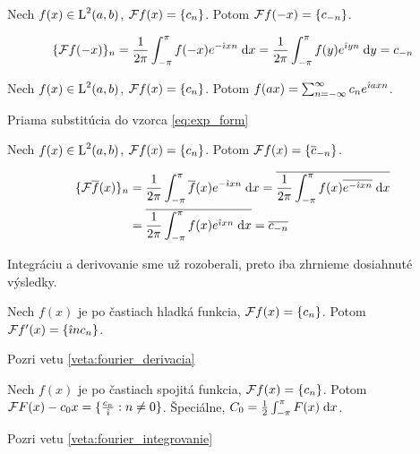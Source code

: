 \begin{veta}
Nech $f(x) \in \mbox{L}^2(a,b)$, $\mathcal{F}{f(x)} = \{c_n\}$. Potom
$\mathcal{F}{f(-x)} = \{c_{-n} \}$.
\label{veta:time_reverse}
\end{veta}
\begin{dokaz}
    \begin{equation*}
      \{\mathcal{F} f(-x)\}_n
        = \frac{1}{2\pi} \int_{-\pi}^{\pi} f(-x) e^{-\hat{\imath} x n} \; \mathrm{d} x 
        = \frac{1}{2\pi} \int_{-\pi}^{\pi} f(y) e^{\hat{\imath} y n} \; \mathrm{d} y
        = c_{-n}
    \end{equation*}
\end{dokaz}

\begin{veta}
Nech $f(x) \in \mbox{L}^2(a,b)$, $\mathcal{F}{f(x)} = \{c_n\}$. Potom
$f(a x) = \sum_{n=-\infty}^{\infty} c_n e^{\hat{\imath} a x n}$.
\end{veta}
\begin{dokaz}
Priama substitúcia do vzorca \eqref{eq:exp_form}
\end{dokaz}


\begin{veta}[Konjugácia]
Nech $f(x) \in \mbox{L}^2(a,b)$, $\mathcal{F}{f(x)} = \{c_n\}$. Potom
$\mathcal{F} f(x) = \{ \overline{c}_{-n} \}$.
\end{veta}
\begin{dokaz}
    \begin{equation*}
    \begin{split}
      \{\mathcal{F} \overline{f}(x)\}_n &= 
        \frac{1}{2\pi} \int_{-\pi}^{\pi} \overline{f}(x) e^{-\hat{\imath} x n} \; \mathrm{d} x 
        = \overline{  \frac{1}{2\pi} \int_{-\pi}^{\pi} f(x) \overline{e^{-\hat{\imath} x n}}
            \; \mathrm{d} x} \\
        &= \overline{  \frac{1}{2\pi} \int_{-\pi}^{\pi} f(x) e^{\hat{\imath} x n}
            \; \mathrm{d} x} 
        = \overline{c_{-n}}
    \end{split}
    \end{equation*}
\end{dokaz}

Integráciu a derivovanie sme už rozoberali, preto iba zhrnieme
dosiahnuté výsledky.
\begin{veta}[O derivovaní]
Nech $f(x)$ je po častiach hladká funkcia, $\mathcal{F}{f(x)} =
\{c_n\}$. Potom $\mathcal{F}{f'(x)} = \{ \hat{\imath} n c_n \}$.
\end{veta}
\begin{dokaz}
    Pozri vetu \ref{veta:fourier_derivacia}
\end{dokaz}

\begin{veta}[O integrovaní]
Nech $f(x)$ je po častiach spojitá funkcia, $\mathcal{F}{f(x)} =
\{c_n\}$. Potom $\mathcal{F}{F(x)-c_0 x} = \{ \frac{c_n}{\hat{\imath}} : n\not=0\}$.
Špeciálne, $C_0 = \frac{1}{2} \int_{-\pi}^{\pi} F(x) \; \mathrm{d} x$.
\end{veta}
\begin{dokaz}
    Pozri vetu \ref{veta:fourier_integrovanie}
\end{dokaz}

